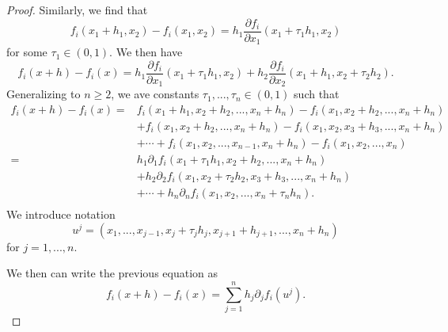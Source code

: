 \documentclass[10pt]{article}
\begin{document}
\begin{proof}
    Similarly, we find that
    \[
      f_{i}(x_{1}+h_{1},x_{2}) - f_{i}(x_{1},x_{2}) = h_{1}\frac{\partial f_{i}}{\partial x_{1}}(x_{1}+\tau_{1}h_{1},x_{2})  
    \]
    for some $\tau_{1} \in (0,1)$. We then have
    \[
      f_{i}(x+h)-f_{i}(x) = h_{1}\frac{\partial f_{i}}{\partial x_{1}}(x_{1}+\tau_{1}h_{1},x_{2}) + 
      h_{2}\frac{\partial f_{i}}{\partial x_{2}}(x_{1}+h_{1},x_{2}+\tau_{2}h_{2}).  
    \]
    Generalizing to $n \geq 2$, we ave constants $\tau_{1},...,\tau_{n} \in (0,1)$ such that
    \[
      \begin{split}
        f_{i}(x+h)-f_{i}(x) =& f_{i}(x_{1}+h_{1},x_{2}+h_{2},...,x_{n}+h_{n}) - f_{i}(x_{1},x_{2}+h_{2},...,x_{n}+h_{n}) \\
                             &+ f_{i}(x_{1},x_{2}+h_{2},...,x_{n}+h_{n}) - f_{i}(x_{1},x_{2},x_{3}+h_{3},...,x_{n}+h_{n}) \\
                             &+ \cdots + f_{i}(x_{1},x_{2},...,x_{n-1},x_{n}+h_{n}) - f_{i}(x_{1},x_{2},...,x_{n}) \\
                            =&h_{1}\partial_{1} f_{i}(x_{1}+\tau_{1}h_{1},x_{2}+h_{2},...,x_{n}+h_{n})\\
                             &+ h_{2}\partial_{2} f_{i}(x_{1},x_{2}+\tau_{2}h_{2},x_{3}+h_{3},...,x_{n}+h_{n})\\
                             &+\cdots+h_{n}\partial_{n}f_{i}(x_{1},x_{2},...,x_{n}+\tau_{n}h_{n}).\\
      \end{split}   
    \]
    We introduce notation
    \[
      u^{j} = (x_{1},...,x_{j-1},x_{j}+\tau_{j}h_{j},x_{j+1}+h_{j+1},...,x_{n}+h_{n})  
    \]
    for $j = 1,...,n$.

    We then can write the previous equation as
    \[
      f_{i}(x+h)-f_{i}(x) = \sum_{j = 1}^{n}h_{j}\partial_{j}f_{i}(u^{j}).  
    \]


\end{proof}
\end{document}
